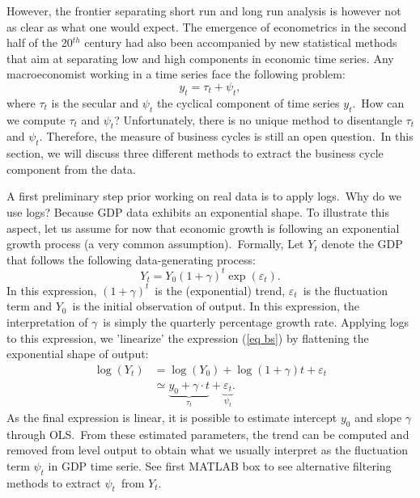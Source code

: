 \documentclass[a4paper,12pt]{article}%
\begin{document}
However, the frontier separating short run and long run analysis is however
not as clear as what one would expect. The emergence of econometrics in the
second half of the 20$^{th}$ century had also been accompanied by new
statistical methods that aim at separating low and high components in economic
time series. Any macroeconomist working in a time series face the following
problem:%
\begin{equation}
y_{t}=\tau_{t}+\psi_{t},
\end{equation}
where $\tau_{t}$ is the secular and $\psi_{t}$ the cyclical component of time
series $y_{t}$.\ How can we compute $\tau_{t}$ and $\psi_{t}$? Unfortunately,
there is no unique method to disentangle $\tau_{t}$ and $\psi_{t}$. Therefore,
the measure of business cycles is still an open question.\ In this section, we
will discuss three different methods to extract the business cycle component
from the data.

A first preliminary step prior working on real data is to apply logs.\ Why do
we use logs? Because GDP data exhibits an exponential shape. To illustrate
this aspect, let us assume for now that economic growth is following an
exponential growth process (a very common assumption).\ Formally, Let $Y_{t}$
denote the GDP that follows the following data-generating process:
\begin{equation}
Y_{t}=Y_{0}\left(  1+\gamma\right)  ^{t}\exp(\varepsilon_{t}). \label{eq bs}%
\end{equation}
In this expression, $\left(  1+\gamma\right)  ^{t}$\ is the (exponential)
trend, $\varepsilon_{t}$\ is the fluctuation term and $Y_{0}$\ is the initial
observation of output. In this expression, the interpretation of $\gamma$\ is
simply the quarterly percentage growth rate. Applying logs to this expression,
we 'linearize' the expression (\ref{eq bs}) by flattening the exponential
shape of output:%
\begin{align}
\log(Y_{t})  &  =\log(Y_{0})+\log(1+\gamma)t+\varepsilon_{t}\\
&  \simeq\underset{\tau_{t}}{\underbrace{y_{0}+\gamma\cdot t}}+\underset
{\psi_{t}}{\underbrace{\varepsilon_{t}}}.
\end{align}
As the final expression is linear, it is possible to estimate intercept
$y_{0}$ and slope $\gamma$ through OLS.\ From these estimated parameters, the
trend can be computed and removed from level output to obtain what we usually
interpret as the fluctuation term $\psi_{t}$ in GDP time serie. See first
MATLAB box to see alternative filtering methods to extract $\psi_{t}$\ from
$Y_{t}$.%
\end{document}
